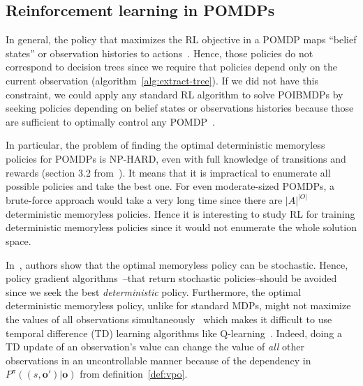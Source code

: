 \subsection{Reinforcement learning in POMDPs}\label{sec:asym}

In general, the policy that maximizes the RL objective in a POMDP maps ``belief states'' or observation histories to actions~\citep{chap2}.
Hence, those policies do not correspond to decision trees since we require that policies depend only on the current observation (algorithm~\ref{alg:extract-tree}).
If we did not have this constraint, we could apply any standard RL algorithm to solve POIBMDPs by seeking policies depending on belief states or observations histories because those are sufficient to optimally control any POMDP~\citep{chap2,lambrechts2025informed}.

In particular, the problem of finding the optimal deterministic memoryless policies for POMDPs is NP-HARD, even with full knowledge of transitions and rewards (section 3.2 from~\cite{littman1}).
It means that it is impractical to enumerate all possible policies and take the best one. 
For even moderate-sized POMDPs, a brute-force approach would take a very long time since there are $|A|^{|O|}$ deterministic memoryless policies.
Hence it is interesting to study RL for training deterministic memoryless policies since it would not enumerate the whole solution space.

In~\cite{learning-pomdp}, authors show that the optimal memoryless policy can be stochastic. Hence, policy gradient algorithms~\citep{pg_sutton}--that return stochastic policies--should be avoided since we seek the best \textit{deterministic} policy. 
Furthermore, the optimal deterministic memoryless policy, unlike for standard MDPs, might not maximize the values of all observations simultaneously~\citep{learning-pomdp} which makes it difficult to use temporal difference (TD) learning algorithms like Q-learning~\citep{watkins1992q}.
Indeed, doing a TD update of an observation's value can change the value of \textit{all} other observations in an uncontrollable manner because of the dependency in $P^{\pi}((s, \boldsymbol{o}')|\boldsymbol{o})$ from definition~\ref{def:vpo}.

